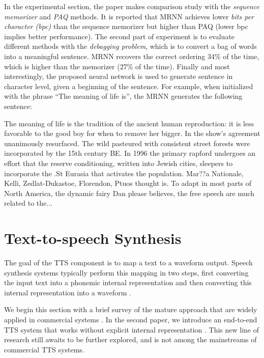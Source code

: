 \documentclass[paper=a4, fontsize=18pt]{article} %
\numberwithin{equation}{section} %
\numberwithin{figure}{section} %
\numberwithin{table}{section} %
\begin{document}
In the experimental section, the paper makes comparison study with the \emph{sequence memorizer}  and \emph{PAQ}  methods. It is reported that MRNN achieves lower \emph{bits per character (bpc)} than the sequence memorizer but higher than PAQ (lower bpc implies better performance). The second part of experiment is to evaluate different methods with the \emph{debagging problem}, which is to convert a bag of words into a meaningful sentence. MRNN recovers the correct ordering 34\% of the time, which is higher than the memorizer (27\% of the time). Finally and most interestingly, the proposed neural network is used to generate sentence in character level, given a beginning of the sentence. For example, when initialized with the phrase ``The meaning of life is'', the MRNN generates the following sentence:

\begin{small}
The meaning of life is the tradition of the ancient human reproduction: it is less favorable to the good boy for when to remove her bigger. In the show's agreement unanimously resurfaced. The wild pasteured with consistent street forests were incorporated by the 15th century BE. In 1996 the primary rapford undergoes an effort that the reserve conditioning, written into Jewish cities, sleepers to incorporate the .St Eurasia that activates the population. Mar??a Nationale, Kelli, Zedlat-Dukastoe, Florendon, Ptuos thought is. To adapt in most parts of North America, the dynamic fairy Dan please believes, the free speech are much related to the...
\end{small}


\section{Text-to-speech Synthesis} \label{Text-to-speech Synthesis}

The goal of the TTS component is to map a text to a waveform output. Speech synthesis systems typically perform this mapping in two steps, first converting the input text into a phonemic internal representation and then converting this internal representation into a waveform \cite{Jurafsky2006}.

We begin this section with a brief survey of the mature approach that are widely applied in commercial systems \cite{Jurafsky2006}. In the second paper, we introduce an end-to-end TTS system that works without explicit internal representation \cite{Wu2016Investigating}. This new line of research still awaits to be further explored, and is not among the mainstreams of commercial TTS systems.
\end{document}
